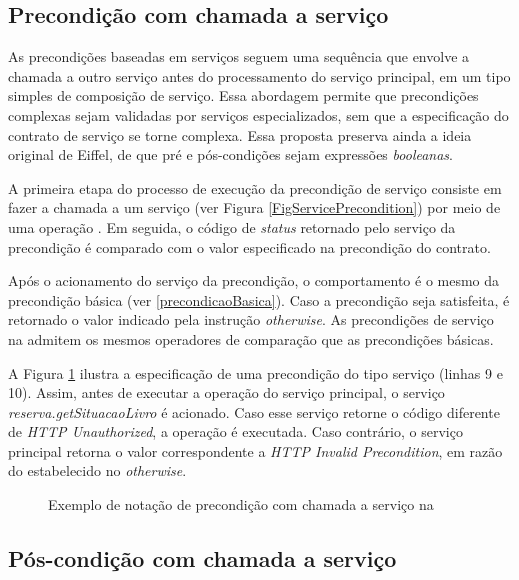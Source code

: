 \subsection{Precondição com chamada a serviço}

As precondições baseadas em serviços seguem uma sequência que envolve a chamada
a outro serviço antes do processamento do serviço principal, em um tipo simples de
composição de serviço. Essa abordagem permite que precondições complexas sejam
validadas por serviços especializados, sem que a especificação do contrato
de serviço se torne complexa. Essa proposta preserva ainda a ideia original de
Eiffel\cite{meyer1988eiffel}, de que pré e pós-condições sejam expressões
\emph{booleanas}.

A primeira etapa do processo de execução da precondição de serviço consiste em
fazer a chamada a um serviço (ver Figura \ref{FigServicePrecondition}) por meio de uma
operação . Em seguida, o código de \textit{status} retornado pelo
serviço da precondição é comparado com o valor especificado na precondição do contrato.

Após o acionamento do serviço da precondição, o comportamento é o mesmo da
precondição básica (ver \ref{precondicaoBasica}). Caso a precondição seja
satisfeita, é retornado o valor indicado pela instrução \emph{otherwise}. As
precondições de serviço na \neoidl{} admitem os mesmos operadores de comparação
que as precondições básicas.

A Figura \ref{lst:DBCPreCondServico} ilustra a especificação de uma precondição
do tipo serviço (linhas 9 e 10). Assim, antes de executar a operação
 do serviço principal, o serviço \emph{reserva.getSituacaoLivro} é acionado. Caso
esse serviço retorne o código diferente de \emph{HTTP
Unauthorized}, a operação  é executada. Caso contrário, o serviço principal retorna o valor
correspondente a \emph{HTTP Invalid Precondition}, em razão do estabelecido no
\emph{otherwise}.


\begin{figure}[htb] 
\begin{small} 

\end{small}
\caption{Exemplo de notação de precondição com chamada a serviço na
\neoidl{}} 
\label{lst:DBCPreCondServico}
\end{figure} 



\subsection{Pós-condição com chamada a serviço}
\label{Pos-condicao servico}

